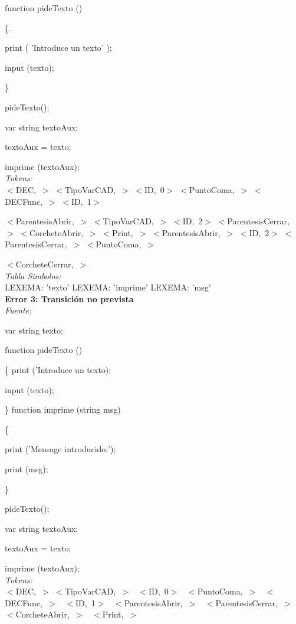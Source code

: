 \documentclass[a4paper, 12pt]{article}
\begin{document}
function pideTexto () 

\{. 

	print ( 'Introduce un texto' ); 
	
	input (texto); 
	
\} 

 pideTexto(); 
 
var string textoAux;

textoAux = texto;

imprime (textoAux);\medskip\\
\emph{Tokens:}\\
\mbox{$<$DEC, $>$}
\mbox{$<$TipoVarCAD, $>$}
\mbox{$<$ID, 0$>$}
\mbox{$<$PuntoComa, $>$}
\mbox{$<$DECFunc, $>$} 
\mbox{$<$ID, 1$>$}

\noindent
\mbox{$<$ParentesisAbrir, $>$}
\mbox{$<$TipoVarCAD, $>$}
\mbox{$<$ID, 2$>$}
\mbox{$<$ParentesisCerrar, $>$}
\mbox{$<$CorcheteAbrir, $>$}
\mbox{$<$Print, $>$}
\mbox{$<$ParentesisAbrir, $>$}
\mbox{$<$ID, 2$>$}
\mbox{$<$ParentesisCerrar, $>$}
\mbox{$<$PuntoComa, $>$}

\noindent
\mbox{$<$CorcheteCerrar, $>$}\medskip\\
\emph{Tabla Simbolos:}\\
  LEXEMA: 'texto'
  LEXEMA: 'imprime'
  LEXEMA: 'msg'\bigskip \\
\textbf{Error 3: Transición no prevista}\\
\emph{Fuente:}

var string texto;

function pideTexto ()

\{
	print ('Introduce un texto);
	
	input (texto);
	
\}
function imprime (string msg)

\{

	print ('Mensage introducido:');
	
	print (msg);
	
\}

pideTexto();

var string textoAux;

textoAux = texto;

imprime (textoAux);\medskip\\
\emph{Tokens:}\\
 \mbox{$<$DEC, $>$} 
 \mbox{$<$TipoVarCAD, $>$ }
 \mbox{$<$ID, 0$>$ }
 \mbox{$<$PuntoComa, $>$ }
 \mbox{$<$DECFunc, $>$ }
 \mbox{$<$ID, 1$>$ }
 \mbox{$<$ParentesisAbrir, $>$ }
 \mbox{$<$ParentesisCerrar, $>$} 
 \mbox{$<$CorcheteAbrir, $>$ }
 \mbox{$<$Print, $>$ }
 
\end{document}
